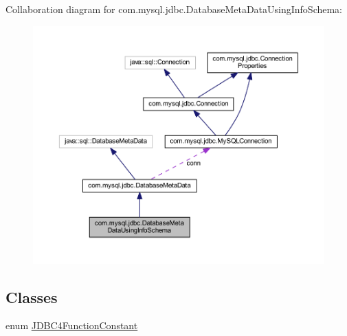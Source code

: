 Collaboration diagram for com.\+mysql.\+jdbc.\+Database\+Meta\+Data\+Using\+Info\+Schema\+:
\nopagebreak
\begin{figure}[H]
\begin{center}
\leavevmode
\includegraphics[width=350pt]{classcom_1_1mysql_1_1jdbc_1_1_database_meta_data_using_info_schema__coll__graph}
\end{center}
\end{figure}
\subsection*{Classes}
\begin{DoxyCompactItemize}
\item 
enum \mbox{\hyperlink{enumcom_1_1mysql_1_1jdbc_1_1_database_meta_data_using_info_schema_1_1_j_d_b_c4_function_constant}{J\+D\+B\+C4\+Function\+Constant}}
\end{DoxyCompactItemize}
